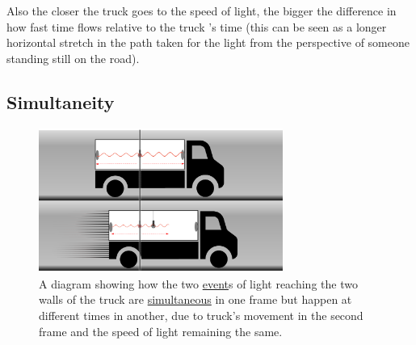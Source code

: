 Also the closer the truck goes to the speed of light, the bigger the difference in how fast time flows relative to the truck 's time (this can be seen as a longer horizontal stretch in the path taken for the light from the perspective of someone standing still on the road).


\subsection{Simultaneity}



\begin{figure}[htbp]
	\centering
	\includegraphics[width=8cm]{images/pdf/lorry_simul.pdf}
	\caption{A diagram showing how the two \protect\hyperlink{def-event}{event}s of light reaching the two walls of the truck are \protect\hyperlink{def-simultaneity}{simultaneous} in one frame but happen at different times in another, due to truck's movement in the second frame and the speed of light remaining the same.}
	\label{fig: truck simultaneity}
\end{figure}

